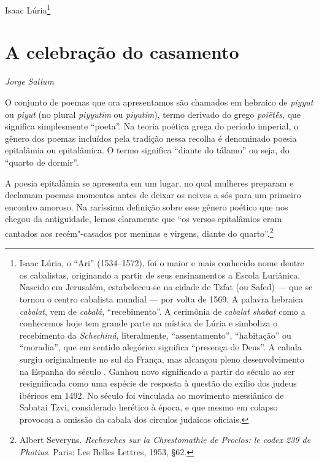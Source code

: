 \begin{flushright}
Isaac Lúria\footnote{Isaac Lúria, o ``Ari'' (1534--1572), foi o maior e mais conhecido nome dentre os cabalistas, originando a partir de seus ensinamentos a Escola Luriânica. Nascido em Jerusalém, estabeleceu-se na cidade de Tzfat (ou Safed) --- que se tornou o centro cabalista mundial --- por volta de 1569. A palavra hebraica \emph{cabalat}, vem de \emph{cabalá}, ``recebimento''. A cerimônia de \emph{cabalat shabat} como a conhecemos hoje tem grande parte na mística de Lúria e simboliza o recebimento da \emph{Schechiná}, literalmente, ``assentamento'', ``habitação'' ou ``moradia'', que em sentido alegórico significa ``presença de Deus''. A cabala surgiu originalmente no sul da França, mas alcançou pleno desenvolvimento na Espanha do século . Ganhou novo significado a partir do século  ao ser resignificada como uma espécie de resposta à questão do exílio dos judeus ibéricos em 1492. No século  foi vinculada ao movimento messiânico de Sabatai Tzvi, considerado herético à época, e que mesmo em colapso provocou a omissão da cabala dos círculos judaicos oficiais.}
\end{flushright}

\chapter*{A celebração do casamento}

\begin{flushright}
\emph{Jorge Sallum}
\end{flushright}

O conjunto de poemas que ora apresentamos são chamados em hebraico de
\emph{piyyut} ou \emph{piyut} (no plural \emph{piyyutim} ou
\emph{piyutim}), termo derivado do grego \emph{poiētḗs}, que significa
simplesmente ``poeta''. Na
teoria poética grega do período imperial, o gênero dos poemas incluídos
pela tradição nessa recolha é denominado poesia epitalâmia ou
epitalâmica. O termo significa ``diante do tálamo'' ou seja, do ``quarto
de dormir''.


A poesia epitalâmia se apresenta em um lugar, no qual mulheres
preparam e declamam poemas momentos antes de deixar os noivos a sós para
um primeiro encontro amoroso. Na raríssima definição sobre esse gênero
poético que nos chegou da antiguidade, lemos claramente que ``os versos
epitalâmios eram cantados aos recém"-casados por meninas e virgens,
diante do quarto''.\footnote{Albert Severyns. \emph{Recherches sur la Chrestomathie de Proclos: le codex 239 de Photius}. Paris: Les Belles Lettres, 1953, §62.}

